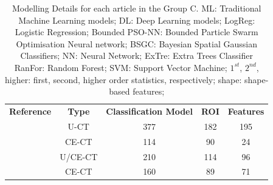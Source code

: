 \documentclass{article}
\begin{document}
\begin{table}[]
    \centering
    \begin{tabular}{ccccc}\toprule
        \multirow{2}{*}{\textbf{Reference}} & \multirow{2}{*}{\textbf{Type}} & \multirow{2}{*}{\textbf{Classification Model}} & \multirow{2}{*}{\textbf{ROI}} & \multirow{2}{*}{\textbf{Features}} \\
        \\ \midrule
        \cite{Bi2017}                       & U-CT                           & 377                                            & 182                           & 195                                \\
        \cite{Bi2022}                       & CE-CT                          & 114                                            & 90                            & 24                                 \\
        \cite{Kong2022}                     & U/CE-CT                        & 210                                            & 114                           & 96                                 \\
        \cite{Zheng2020}                    & CE-CT                          & 160                                            & 89                            & 71                                 \\
        \bottomrule
    \end{tabular}
    \caption{Modelling Details for each article in the Group C. ML: Traditional Machine Learning models; DL: Deep Learning models; LogReg: Logistic Regression;
        Bounded PSO-NN: Bounded Particle Swarm Optimisation Neural network; BSGC: Bayesian Spatial Gaussian Classifiers; NN: Neural Network; ExTre: Extra Trees Classifier
        RanFor: Random Forest; SVM: Support Vector Machine; $1^{st}$, $2^{nd}$, higher: first, second, higher order statistics, respectively; shape: shape-based features;}
    \label{tab:model_C}
\end{table}
\end{document}
